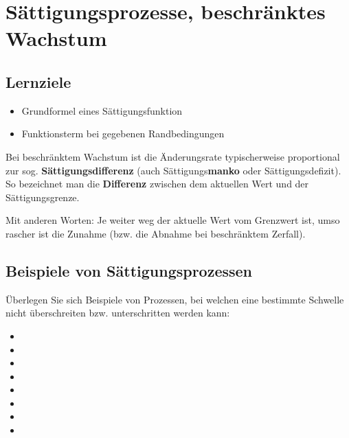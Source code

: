 \section{Sättigungsprozesse, beschränktes Wachstum}

\subsection*{Lernziele}
\begin{itemize}
	\item Grundformel eines Sättigungsfunktion
  \item Funktionsterm bei gegebenen Randbedingungen 
\end{itemize}

Bei beschränktem Wachstum ist die Änderungsrate typischerweise
proportional zur
sog. \textbf{Sättigungsdifferenz}
(auch Sättigungs\textbf{manko} oder Sättigungsdefizit).
  So bezeichnet man die \textbf{Differenz} zwischen dem
  aktuellen Wert und der Sättigungsgrenze.

Mit anderen Worten: Je weiter weg der aktuelle Wert vom Grenzwert ist, umso rascher ist die Zunahme (bzw. die Abnahme bei beschränktem Zerfall).

\newpage


\subsection{Beispiele von Sättigungsprozessen}
Überlegen Sie sich Beispiele von Prozessen, bei welchen eine bestimmte Schwelle nicht überschreiten bzw. unterschritten werden kann:
\begin{itemize}
	\item {}
	\item {}
	\item {}
	\item {}
	\item {}
	\item {}
        \item {}
        \item \Lueckentext{\dotfill}
\end{itemize}
\newpage


